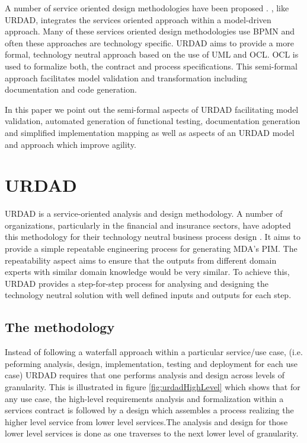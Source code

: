 A number of service oriented design methodologies have been proposed
\cite{Moosavi:methodForServiceOrientedDesign,ma:mddPlatformForSoa}.
\cite{ma:mddPlatformForSoa}, like URDAD, integrates the services oriented approach within a 
model-driven approach. Many of these services oriented design methodologies use BPMN
and often these approaches are technology specific. URDAD aims to provide
a more formal, technology neutral approach based on the use of UML and
OCL. OCL is used to formalize both, the contract and process specifications.
This semi-formal approach facilitates model validation and transformation including
documentation and code generation.

In this paper we point out the semi-formal aspects of URDAD facilitating model validation,
automated generation of functional testing, documentation generation and simplified implementation mapping as well as aspects of an URDAD model and approach which improve agility.


\section{URDAD}
\label{sec:urdad}

URDAD
\cite{solms:generatingMdasPimUsingUrdad,solms:urdad}
is a service-oriented analysis and design methodology. A number
of organizations, particularly in the financial and insurance
sectors, have adopted this methodology for their technology 
neutral business process design  
\cite{klopper:compareSoftwareMethodologies}.
It aims to provide a simple repeatable engineering process for
generating MDA's PIM. The repeatability aspect aims to ensure that the
outputs from different domain experts with similar
domain knowledge would be very similar. To achieve this,
URDAD provides a step-for-step process for analysing and
designing the technology neutral solution with well defined inputs
and outputs for each step.


\subsection{The methodology}

Instead of following a waterfall approach within a particular service/use case, 
(i.e. peforming analysis, design, implementation, testing and deployment for each use case)
URDAD requires that
one performs analysis and design across levels of granularity. This is illustrated in figure
\ref{fig:urdadHighLevel} which shows that for any use case, the high-level requirements analysis
and formalization within a services contract is followed by a design which assembles a process
realizing the higher level service from lower level services.The analysis and design for those
lower level services is done as one traverses to the next lower level of granularity.


